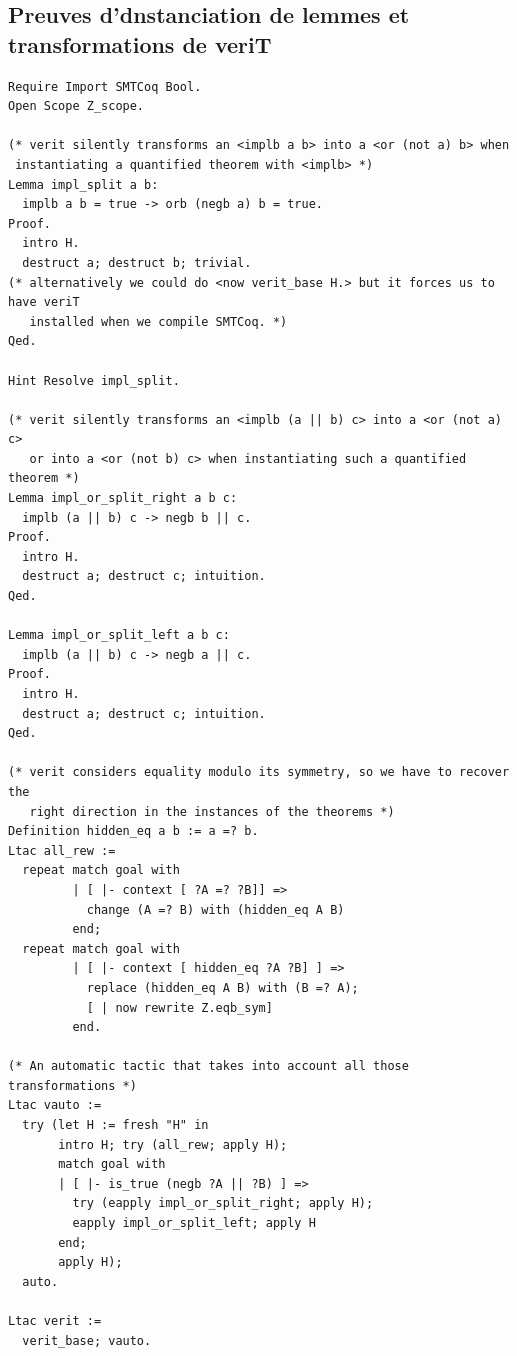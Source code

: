 \documentclass[11pt]{article}
\begin{document}
\subsection{Preuves d'dnstanciation de lemmes et transformations de veriT} \label{annexe_simplifications}

\lstset{language=coq}
\begin{lstlisting}[frame=single]
Require Import SMTCoq Bool.
Open Scope Z_scope.

(* verit silently transforms an <implb a b> into a <or (not a) b> when
 instantiating a quantified theorem with <implb> *)
Lemma impl_split a b:
  implb a b = true -> orb (negb a) b = true.
Proof.
  intro H.
  destruct a; destruct b; trivial.
(* alternatively we could do <now verit_base H.> but it forces us to have veriT
   installed when we compile SMTCoq. *)
Qed.

Hint Resolve impl_split.

(* verit silently transforms an <implb (a || b) c> into a <or (not a) c> 
   or into a <or (not b) c> when instantiating such a quantified theorem *)
Lemma impl_or_split_right a b c:
  implb (a || b) c -> negb b || c.
Proof.
  intro H.
  destruct a; destruct c; intuition. 
Qed.

Lemma impl_or_split_left a b c:
  implb (a || b) c -> negb a || c.
Proof.
  intro H.
  destruct a; destruct c; intuition.
Qed.

(* verit considers equality modulo its symmetry, so we have to recover the
   right direction in the instances of the theorems *)
Definition hidden_eq a b := a =? b.
Ltac all_rew :=
  repeat match goal with
         | [ |- context [ ?A =? ?B]] =>
           change (A =? B) with (hidden_eq A B)
         end;
  repeat match goal with
         | [ |- context [ hidden_eq ?A ?B] ] =>
           replace (hidden_eq A B) with (B =? A);
           [ | now rewrite Z.eqb_sym]
         end.

(* An automatic tactic that takes into account all those transformations *)
Ltac vauto :=
  try (let H := fresh "H" in
       intro H; try (all_rew; apply H);
       match goal with
       | [ |- is_true (negb ?A || ?B) ] =>
         try (eapply impl_or_split_right; apply H);
         eapply impl_or_split_left; apply H
       end;
       apply H);
  auto.

Ltac verit :=
  verit_base; vauto.
\end{lstlisting}
\end{document}
